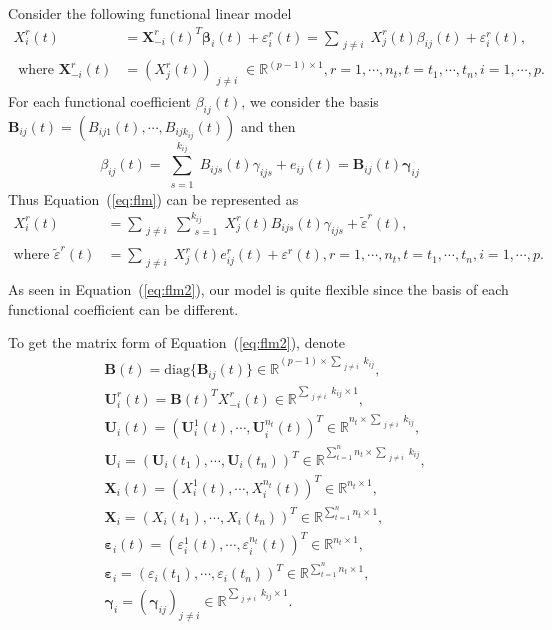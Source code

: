 \documentclass[11pt]{article}
\newcommand{\R}{\mathbb R}
\newcommand{\bX}{\mathbf X}
\newcommand{\bB}{\mathbf B}
\newcommand{\bU}{\mathbf U}
\newcommand{\bbeta}{{\boldsymbol{\beta}}}
\newcommand{\bvarepsilon}{\boldsymbol{\varepsilon}}
\newcommand{\bgamma}{\boldsymbol{\gamma}}
\begin{document}
Consider the following functional linear model
\begin{equation} 	\label{eq:flm}
    \begin{aligned}
    X_i^r(t) &= {\bX_{-i}^r(t)}^T \bbeta_i(t) + \varepsilon_i^r(t) = \sum_{\substack{j\neq i}} X_j^r(t) \beta_{ij}(t) + \varepsilon_i^r(t),\\
    \text{ where }\bX_{-i}^r(t) &= (X_j^r(t))_{\substack{j \neq i}} \in \R^{(p-1) \times 1}, r = 1, \cdots, n_t, t = t_1, \cdots, t_n, i = 1, \cdots, p.
    \end{aligned}
\end{equation}
For each functional coefficient $\beta_{ij}(t)$, we consider the basis $\bB_{ij}(t) = (B_{ij1}(t), \cdots, B_{ijk_{ij}}(t) )$ and then 
$$\beta_{ij}(t) = \sum_{\substack{s=1}}^{k_{ij}} B_{ijs}(t) \gamma_{ijs} + e_{ij}(t) = \bB_{ij}(t) \bgamma_{ij} $$
Thus Equation~(\ref{eq:flm}) can be represented as
\begin{equation}
	\label{eq:flm2}
	\begin{aligned}
	X_i^r(t) &= \sum_{\substack{j \neq i}} \sum_{\substack{s=1}}^{k_{ij}} X_j^r(t) B_{ijs}(t) \gamma_{ijs} + \tilde{\varepsilon}^r(t), \\
	\text{where } \tilde{\varepsilon}^r(t) &= \sum_{\substack{j \neq i}} X_j^r(t)e_{ij}^r(t) + \varepsilon^r(t), r = 1, \cdots, n_t, t = t_1, \cdots, t_n, i = 1, \cdots, p.\\
	\end{aligned}
\end{equation}
As seen in Equation~(\ref{eq:flm2}), our model is quite flexible since the basis of each functional coefficient can be different.

To get the matrix form of Equation~(\ref{eq:flm2}), denote 
\begin{align*}
	&\bB(t) = \text{diag}\{\bB_{ij}(t)\} \in \R^{(p-1)\times \sum_{\substack{j \neq i}}k_{ij} },\\
	&\bU_i^r(t) = \bB(t)^T X_{-i}^r(t) \in \R^{ \sum_{\substack{j \neq i}}k_{ij} \times 1},\\
	&\bU_i(t) = ( \bU_i^1(t), \cdots, \bU_i^{n_t}(t) )^T \in \R^{n_t \times \sum_{\substack{j \neq i}}k_{ij}},\\
	&\bU_i = ( \bU_i(t_1), \cdots, \bU_i(t_n) )^T \in \R^{\sum_{t = 1}^{n}n_t \times \sum_{\substack{j \neq i}}k_{ij}},\\
	&\bX_i(t) = (X_i^1(t), \cdots, X_i^{n_t}(t))^T \in \R^{n_t \times 1},\\
	&\bX_i = (X_i(t_1), \cdots, X_i(t_n))^T \in \R^{\sum_{t = 1}^{n}n_t \times 1},\\
	&\bvarepsilon_i(t) = (\varepsilon_i^1(t), \cdots, \varepsilon_i^{n_t}(t))^T \in \R^{n_t \times 1},\\
	&\bvarepsilon_i = (\varepsilon_i(t_1), \cdots, \varepsilon_i(t_n))^T \in \R^{\sum_{t = 1}^{n}n_t \times 1},\\
	&\bgamma_i = (\bgamma_{ij})_{j \neq i} \in \R^{\sum_{\substack{j \neq i}}k_{ij} \times 1}.
\end{align*}
\end{document}
